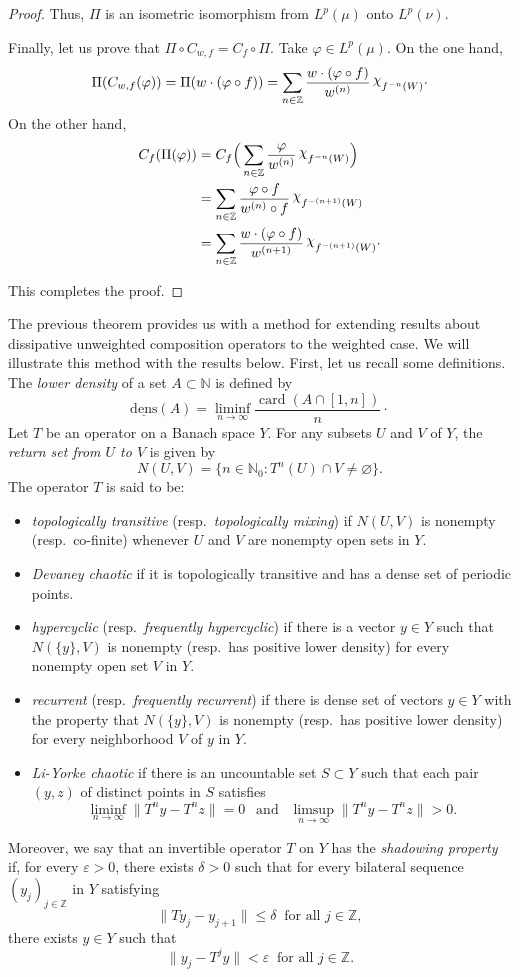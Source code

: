 \documentclass[12pt]{article}
\theoremstyle{plain}
\theoremstyle{definition}
\newcommand{\N}{\mathbb{N}} %
\newcommand{\Z}{\mathbb{Z}} %
\newcommand{\card}{\operatorname{card}}
\newcommand{\ldens}{\operatorname{\underline{dens}}}
\newcommand{\eps}{\varepsilon}
\DeclareRobustCommand{\rchi}{{\mathpalette\irchi\relax}}
\newcommand{\irchi}[2]{\raisebox{\depth}{$#1\chi$}}
\begin{document}
\begin{proof}
Thus, $\Pi$ is an isometric isomorphism from $L^p(\mu)$ onto $L^p(\nu)$. 

Finally, let us prove that $\Pi \circ C_{w,f} = C_f \circ \Pi$. Take $\varphi \in L^p(\mu)$. On the one hand, 
\[
\Pi (C_{w,f}(\varphi)) = \Pi(w \cdot (\varphi \circ f)) = \sum_{n \in \Z}  \frac{w \cdot (\varphi \circ f)}{w^{(n)}}\, \rchi_{f^{-n}(W)}\cdot
\]
On the other hand, 
\begin{align*}
C_f(\Pi(\varphi))
  &= C_f\Big(\sum_{n \in \Z} \frac{\varphi}{w^{(n)}}\, \rchi_{f^{-n}(W)}\Big)\\
  &= \sum_{n \in \Z} \frac{\varphi \circ f}{w^{(n)}\circ f}\, \rchi_{f^{-(n+1)}(W)}\\
  &= \sum_{n \in \Z} \frac{w \cdot (\varphi \circ f)}{w^{(n+1)}}\, \rchi_{f^{-(n+1)}(W)}\cdot
\end{align*}

This completes the proof.
\end{proof}

The previous theorem provides us with a method for extending results 
about dissipative unweighted composition operators to the weighted case.
We will illustrate this method with the results below. First, let us recall some definitions.
The {\em lower density} of a set $A \subset \N$ is defined by
\[
\ldens(A) = \liminf_{n \to \infty} \frac{\card(A \cap [1,n])}{n}\cdot
\]
Let $T$ be an operator on a Banach space $Y$. For any subsets $U$ and $V$ of $Y$, the {\em return set from $U$ to $V$} is given by
\[
N(U,V) = \{n \in \N_0 : T^n(U) \cap V \neq \varnothing\}.
\]
The operator $T$ is said to be:
\begin{itemize}
\item {\em topologically transitive} (resp.\ {\em topologically mixing}) if $N(U,V)$ is nonempty (resp.\ co-finite) 
  whenever $U$ and $V$ are nonempty open sets in $Y$.
\item {\em Devaney chaotic} if it is topologically transitive and has a dense set of periodic points.
\item {\em hypercyclic} (resp.\ {\em frequently hypercyclic}) if there is a vector $y \in Y$ such that $N(\{y\},V)$ is nonempty 
  (resp.\ has positive lower density) for every nonempty open set $V$ in $Y$.
\item {\em recurrent} (resp.\ {\em frequently recurrent}) if there is dense set of vectors $y \in Y$ with the property that
  $N(\{y\},V)$ is nonempty (resp.\ has positive lower density) for every neighborhood $V$ of $y$ in $Y$.
\item {\em Li-Yorke chaotic} if there is an uncountable set $S \subset Y$ such that each pair $(y,z)$ of distinct points in $S$ satisfies
  \[
  \liminf_{n \to \infty} \|T^n y - T^n z\| = 0 \ \ \text{ and } \ \ \limsup_{n \to \infty} \|T^n y - T^n z\| > 0.
  \]
\end{itemize}
Moreover, we say that an invertible operator $T$ on $Y$ has the {\em shadowing property} if, for every $\eps > 0$, 
there exists $\delta > 0$ such that for every bilateral sequence $(y_j)_{j \in \Z}$ in $Y$ satisfying
\[
\|T y_j - y_{j+1}\| \leq \delta \ \text{ for all } j \in \Z,
\]
there exists $y \in Y$ such that
\[
\|y_j - T^j y\| < \eps \ \text{ for all } j \in \Z.
\]
\end{document}

